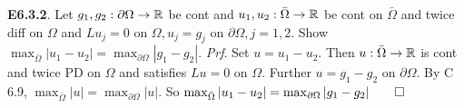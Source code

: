 {\bf E6.3.2}. Let $g_1, g_2: \partial \Omega \rightarrow \mathbb{R}$ be cont and $u_1, u_2: \bar{\Omega} \rightarrow \mathbb{R}$ be cont on $\bar{\Omega}$ and twice diff on $\Omega$ and $L u_j = 0$ on $\Omega,  u_j = g_j $ on $ \partial \Omega, j = 1, 2.$ Show $\max_{\bar{\Omega}} |u_1 - u_2| = \max_{\partial \Omega} |g_1 - g_2|.$ {\it Prf}. Set $u = u_1 - u_2$. Then $u: \bar{\Omega} \rightarrow \mathbb{R}$ is cont and twice PD on $\Omega$ and satisfies $Lu=0$ on $\Omega$. Further $u = g_1 - g_2$ on $\partial \Omega$. By C 6.9, $\max_{\bar{\Omega}} |u| = \max_{\partial \Omega} |u|.$ So $\max_{\bar{\Omega}} |u_1 - u_2| = \max_{\partial \Omega} |g_1 - g_2| \qed$
